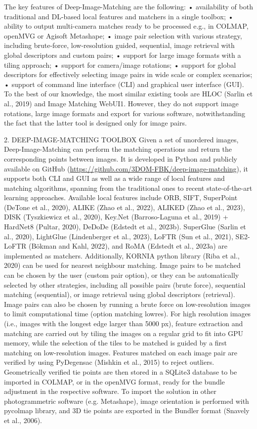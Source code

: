 The key features of Deep-Image-Matching are the following: 
    • availability of both traditional and DL-based local features and matchers in a single toolbox;
    • ability to output multi-camera matches ready to be processed e.g., in COLMAP, openMVG or Agisoft Metashape;
    • image pair selection with various strategy, including brute-force, low-resolution guided, sequential, image retrieval with global descriptors and custom pairs;
    • support for large image formats with a tiling approach;
    • support for camera/image rotations;
    • support for global descriptors for effectively selecting image pairs in wide scale or complex scenarios;
    • support of command line interface (CLI) and graphical user interface (GUI).
To the best of our knowledge, the most similar existing tools are HLOC (Sarlin et al., 2019) and Image Matching WebUI1. However, they do not support image rotations, large image formats and export for various software, notwithstanding the fact that the latter tool is designed only for image pairs.

    2. DEEP-IMAGE-MATCHING TOOLBOX
Given a set of unordered images, Deep-Image-Matching can perform the matching operations and return the corresponding points between images. It is developed in Python and publicly available on GitHub (\url{https://github.com/3DOM-FBK/deep-image-matching}), it supports both CLI and GUI as well as a wide range of local features and matching algorithms, spanning from the traditional ones to recent state-of-the-art learning approaches. Available local features include ORB, SIFT, SuperPoint (DeTone et al., 2020), ALIKE (Zhao et al., 2022), ALIKED (Zhao et al., 2023), DISK (Tyszkiewicz et al., 2020), Key.Net (Barroso-Laguna et al., 2019) + HardNet8 (Pultar, 2020), DeDoDe (Edstedt et al., 2023b). SuperGlue (Sarlin et al., 2020), LightGlue (Lindenberger et al., 2023), LoFTR (Sun et al., 2021), SE2-LoFTR (Bökman and Kahl, 2022), and RoMA (Edstedt et al., 2023a) are implemented as matchers. Additionally, KORNIA python library (Riba et al., 2020) can be used for nearest neighbour matching.
Image pairs to be matched can be chosen by the user (custom pair option), or they can be automatically selected by other strategies, including all possible pairs (brute force), sequential matching (sequential), or image retrieval using global descriptors (retrieval). Image pairs can also be chosen by running a brute force on low-resolution images to limit computational time (option matching lowres).
For high resolution images (i.e., images with the longest edge larger than 5000 px), feature extraction and matching are carried out by tiling the images on a regular grid to fit into GPU memory, while the selection of the tiles to be matched is guided by a first matching on low-resolution images. Features matched on each image pair are verified by using PyDegensac (Mishkin et al., 2015) to reject outliers. Geometrically verified tie points are then stored in a SQLite3 database to be imported in COLMAP, or in the openMVG format, ready for the bundle adjustment in the respective software. To import the solution in other photogrammetric software (e.g. Metashape), image orientation is performed with pycolmap library, and 3D tie points are exported in the Bundler format (Snavely et al., 2006).

\makechapterbibliography{}
